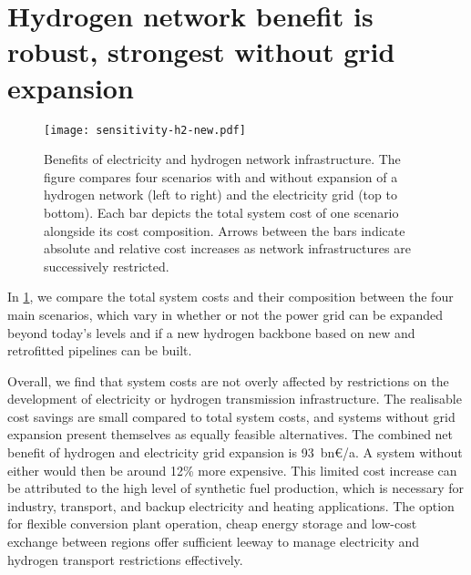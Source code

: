 
\section*{Hydrogen network benefit is robust, strongest without grid expansion}
\label{sec:h2}

\begin{figure}
    \centering
    \texttt{[image: sensitivity-h2-new.pdf]}
    \caption{Benefits of electricity and hydrogen network infrastructure. The
    figure compares four scenarios with and without expansion of a hydrogen
    network (left to right) and the electricity grid (top to bottom). Each bar
    depicts the total system cost of one scenario alongside its cost
    composition. Arrows between the bars indicate absolute and relative cost
    increases as network infrastructures are successively restricted.}
    \label{fig:sensitivity-h2}
\end{figure}

In \cref{fig:sensitivity-h2}, we compare the total system costs and their
composition between the four main scenarios, which vary in whether or not the
power grid can be expanded beyond today's levels and if a new hydrogen backbone
based on new and retrofitted pipelines can be built.


Overall, we find that system costs are not overly affected by restrictions on
the development of electricity or hydrogen transmission infrastructure. The
realisable cost savings are small compared to total system costs, and systems
without grid expansion present themselves as equally feasible alternatives. The
combined net benefit of hydrogen and electricity grid expansion is 93~bn\euro/a.
A system without either would then be around 12\% more expensive. This limited
cost increase can be attributed to the high level of synthetic fuel production,
which is necessary for industry, transport, and backup electricity and heating
applications. The option for flexible conversion plant operation, cheap energy
storage and low-cost exchange between regions offer sufficient leeway to manage
electricity and hydrogen transport restrictions effectively.


